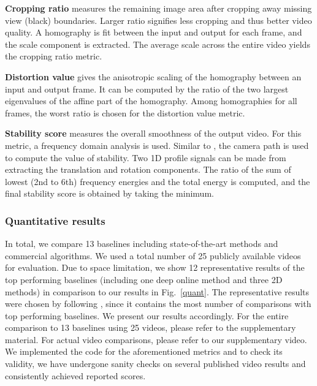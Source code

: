 \textbf{Cropping ratio} measures the remaining image area after cropping away missing view (black) boundaries.
Larger ratio signifies less cropping and thus better video quality.
A homography is fit between the input and output for each frame, and the scale component is extracted.
The average scale across the entire video yields the cropping ratio metric.

\textbf{Distortion value} gives the anisotropic scaling of the homography between an input and output frame.
It can be computed by the ratio of the two largest eigenvalues of the affine part of the homography.
Among homographies for all frames, the worst ratio is chosen for the distortion value metric.

\textbf{Stability score} measures the overall smoothness of the output video.
For this metric, a frequency domain analysis is used.
Similar to \cite{liu2013bundled}, the camera path is used to compute the value of stability.
Two 1D profile signals can be made from extracting the translation and rotation components.
The ratio of the sum of lowest (2nd to 6th) frequency energies and the total energy is computed, and the final stability score is obtained by taking the minimum.

\subsubsection{Quantitative results}
In total, we compare 13 baselines including state-of-the-art methods and commercial algorithms.
We used a total number of 25 publicly available videos~\cite{liu2013bundled} for evaluation.
Due to space limitation, we show 12 representative results of the top performing baselines (including one deep online method and three 2D methods) in comparison to our results in Fig.~\ref{quant}.
The representative results were chosen by following \cite{liu2017codingflow}, since it contains the most number of comparisons with top performing baselines.
We present our results accordingly.
For the entire comparison to 13 baselines using 25 videos, please refer to the supplementary material.
For actual video comparisons, please refer to our supplementary video.
We implemented the code for the aforementioned metrics and to check its validity, we have undergone sanity checks on several published video results and consistently achieved reported scores.

